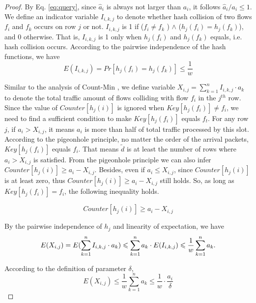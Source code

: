 \begin{proof}	
By Eq. \eqref{eq:query}, since $\hat{a}_i$ is always not larger than $a_i$, it follows $\hat{a}_i/{a_i} \le 1$. We define an indicator variable $I_{i,k,j}$ to denote whether hash collision of two flows $f_i$ and $f_k$ occurs on row $j $ or not. $I_{i,k,j}$ is 1 if ($f_i \ne f_k $ ) $\land $ ($h_j(f_i)=h_j(f_k)$), and 0 otherwise. That is, $I_{i,k,j}$ is 1 only when $h_j(f_i)$ and $h_j(f_k)$ equals, i.e. hash collision occurs. According to the pairwise independence of the hash functions, we have
\begin{equation}
E(I_{i,k,j})=Pr[h_j(f_i)=h_j(f_k)]\le \frac{1}{w}
\end{equation}
	

Similar to the analysis of Count-Min \cite{cormode2004improved}, we define variable $X_{i,j}=\sum\nolimits_{k=1}^{n}I_{i,k,j}\cdot a_k$ to denote the total traffic amount of flows colliding with flow $f_i$ in the $j^{th}$ row. Since the value of $Counter[h_j(i)]$ is ignored when $Key[h_j(f_i)]\ne f_i$, we need to find a sufficient condition to make $Key[h_j(f_i)]$ equals $f_t$. For any row $j$, if $a_i > X_{i,j}$, it means $a_i$ is more than half of total traffic processed by this slot. According to the pigeonhole principle, no matter the order of the arrival packets, $Key[h_j(f_i)]$ equals $f_i$. That means $\tilde{d}$ is at least the number of rows where $a_i > X_{i,j}$ is satisfied. From the pigeonhole principle we can also infer $Counter[h_j(i)]\ge a_i-X_{i,j}$. Besides, even if $a_i \le X_{i,j}$, since $Counter[h_j(i)]$ is at least zero, thus $Counter[h_j(i)]\ge a_i-X_{i,j}$ still holds. So, as long as $Key[h_j(f_i)] = f_i$, the following inequality holds.

\begin{equation}\label{eq:ai_xij}
Counter[h_j(i)]\ge a_i-X_{i,j}
\end{equation}

By the pairwise independence of $h_j$ and linearity of expectation, we have
\begin{equation}\label{eq:ex}\notag
E(X_{i,j})=E(\sum_{k=1}^{n}I_{i,k,j}\cdot a_k)\le\sum_{k=1}^{n} a_k\cdot E(I_{i,k,j})\le \frac{1}{w}\sum_{k=1}^{n}a_k.
\end{equation}

	
According to the definition of parameter $\delta$,
\begin{equation}\label{eq:ex-delta}
E(X_{i,j})\le \frac{1}{w}\sum_{k=1}^{n}a_k\le \frac{1}{w}\cdot \frac{a_i}{\delta}
\end{equation}


\end{proof}
